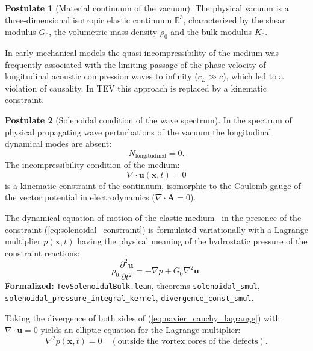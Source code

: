 \documentclass[11pt,a4paper]{article}
\theoremstyle{definition}
\newtheorem{postulate}{Postulate}
\theoremstyle{remark}
\begin{document}
\begin{postulate}[Material continuum of the vacuum]
	The physical vacuum is a three-dimensional isotropic elastic continuum $\mathbb{R}^3$, characterized by the shear modulus $G_0$, the volumetric mass density $\rho_0$ and the bulk modulus $K_0$.
\end{postulate}
	
In early mechanical models the quasi-incompressibility of the medium was frequently associated with the limiting passage of the phase velocity of longitudinal acoustic compression waves to infinity ($c_L \gg c$), which led to a violation of causality. In TEV this approach is replaced by a kinematic constraint.
	
\begin{postulate}[Solenoidal condition of the wave spectrum]
	In the spectrum of physical propagating wave perturbations of the vacuum the longitudinal dynamical modes are absent:
\begin{equation}
	N_{\mathrm{longitudinal}} = 0.
	\label{eq:n_longitudinal_zero}
\end{equation}
	The incompressibility condition of the medium:
\begin{equation}
	\nabla \cdot \mathbf{u}(\mathbf{x}, t) = 0
	\label{eq:solenoidal_constraint}
\end{equation}
	is a kinematic constraint of the continuum, isomorphic to the Coulomb gauge of the vector potential in electrodynamics ($\nabla \cdot \mathbf{A} = 0$).
\end{postulate}
	
The dynamical equation of motion of the elastic medium~\cite{Navier1827,Cauchy1828} in the presence of the constraint (\ref{eq:solenoidal_constraint}) is formulated variationally with a Lagrange multiplier $p(\mathbf{x}, t)$ having the physical meaning of the hydrostatic pressure of the constraint reactions:
\begin{equation}
	\rho_0 \frac{\partial^2 \mathbf{u}}{\partial t^2} = -\nabla p + G_0 \nabla^2 \mathbf{u}.
	\label{eq:navier_cauchy_lagrange}
\end{equation}
\noindent\small\textbf{Formalized:} \texttt{TevSolenoidalBulk.lean}, theorems \texttt{solenoidal_smul}, \texttt{solenoidal_pressure_integral_kernel}, \texttt{divergence\_const\_smul}.

Taking the divergence of both sides of (\ref{eq:navier_cauchy_lagrange}) with $\nabla \cdot \mathbf{u} = 0$ yields an elliptic equation for the Lagrange multiplier:
\begin{equation}
	\nabla^2 p(\mathbf{x}, t) = 0 \quad (\text{outside the vortex cores of the defects}).
	\label{eq:laplace_pressure}
\end{equation}
	
\end{document}
